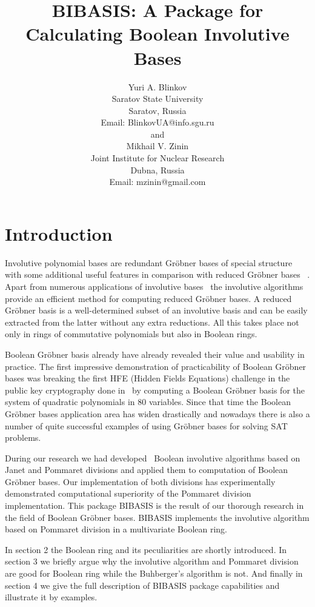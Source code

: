 \documentclass[12pt]{article}
\title{BIBASIS: A Package for Calculating Boolean Involutive Bases}
\date{}
\author{
    Yuri A. Blinkov\\[0.2cm]
    Saratov State University\\
    Saratov, Russia\\
    Email: BlinkovUA@info.sgu.ru\\[0.2cm]
    and \\[0.2cm]
    Mikhail V. Zinin\\[0.2cm]
    Joint Institute for Nuclear Research\\
    Dubna, Russia\\[0.2cm]
    Email: mzinin@gmail.com}
\newcommand{\Gr}{Gr\"obner }
\begin{document}
\maketitle


\section{Introduction}

Involutive polynomial bases are redundant \Gr bases of special structure with some additional useful features in comparison 
with reduced \Gr bases~\cite{GB'98} . Apart from numerous applications of involutive bases~\cite{Seiler'10} the 
involutive algorithms~\cite{Gerdt'05} provide an efficient method for computing reduced \Gr bases. A reduced \Gr basis 
is a well-determined subset of an involutive basis and can be easily extracted from the latter without any extra reductions. 
All this takes place not only in rings of commutative polynomials but also in Boolean rings.

Boolean \Gr basis already have already revealed their value and usability in  practice. The first impressive demonstration
of practicability of Boolean \Gr bases was breaking the first HFE (Hidden Fields Equations) challenge in the public
key cryptography done in~\cite{Faugere'03} by computing a Boolean \Gr basis for the system of quadratic
polynomials in 80 variables. Since that time the Boolean \Gr bases application area has widen drastically and nowadays there 
is also a number of quite successful examples of using \Gr bases for solving SAT problems.

During our research we had developed~\cite{ISSAC'08, PaCS'08, PCA'09} Boolean involutive algorithms based on Janet and Pommaret 
divisions and applied them to computation of Boolean \Gr bases. Our implementation of both divisions has experimentally 
demonstrated computational superiority of the Pommaret division implementation. This package BIBASIS is the result
of our thorough research in the field of Boolean \Gr bases. BIBASIS implements the involutive algorithm based on Pommaret 
division in a multivariate Boolean ring.

In section 2 the Boolean ring and its peculiarities are shortly introduced. In section 3 we briefly argue  
why the involutive algorithm and Pommaret division are good for Boolean ring while the Buhberger's algorithm is not.
And finally in section 4 we give the full description of BIBASIS package capabilities and illustrate it by examples.
\end{document}

